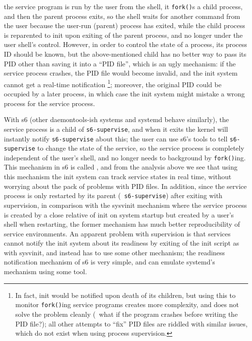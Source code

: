 the service program is run by the user from the shell, it \verb|fork()|s a child
process, and then the parent process exits, so the shell waits for another
command from the user because the user-run (parent) process has exited, while
the child process is reparented to init upon exiting of the parent process, and
no longer under the user shell's control.  However, in order to control the
state of a process, its process ID should be known, but the above-mentioned
child has no better way to pass its PID other than saving it into a ``PID
file'', which is an ugly mechanism: if the service process crashes, the PID file
would become invalid, and the init system cannot get a real-time notification%
\footnote{In fact, init would be notified upon death of its children, but using
this to monitor \texttt{fork()}ing service programs creates more complexity,
and does not solve the problem cleanly (\eg~what if the program crashes before
writing the PID file?); all other attempts to ``fix'' PID files are riddled
with similar issues, which do not exist when using process supervision.};
moreover, the original PID could be occupied by a later process, in which
case the init system might mistake a wrong process for the service process.

With s6 (other daemontools-ish systems and systemd behave similarly), the
service process is a child of \verb|s6-supervise|, and when it exits the kernel
will instantly notify \verb|s6-supervise| about this; the user can use s6's
tools to tell \verb|s6-supervise| to change the state of the service, so the
service process is completely independent of the user's shell, and no longer
needs to background by \verb|fork()|ing.  This mechanism in s6 is called
, and from the analysis above we see that using
this mechanism the init system can track service states in real time, without
worrying about the pack of problems with PID files.  In addition, since the
service process is only restarted by its parent (\eg~\verb|s6-supervise|)
after exiting with supervision, in comparison with the sysvinit mechanism
where the service process is created by a close relative of init on system
startup but created by a user's shell when restarting, the former mechanism
has much better reproducibility of service environments.  An apparent
problem with supervision is that services cannot notify the init system
about its readiness by exiting of the init script as with sysvinit,
and instead has to use some other mechanism; the readiness notification
mechanism of s6 is very simple, and can emulate
systemd's mechanism using some tool.

